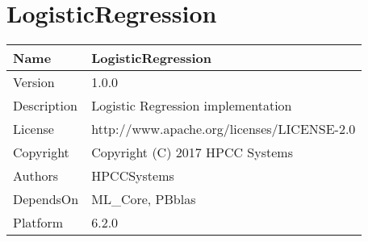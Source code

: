 \chapter*{LogisticRegression}
\hypertarget{ecldoc:toc:LogisticRegression}{}

\begin{tabularx}{\textwidth}{|l|X|}
\hline
Name & LogisticRegression \\
\hline
Version & 1.0.0 \\
\hline
Description & Logistic Regression implementation \\
\hline
License & http://www.apache.org/licenses/LICENSE-2.0 \\
\hline
Copyright & Copyright (C) 2017 HPCC Systems \\
\hline
Authors & HPCCSystems \\
\hline
DependsOn & ML\_Core, PBblas \\
\hline
Platform & 6.2.0 \\
\hline
\end{tabularx}

